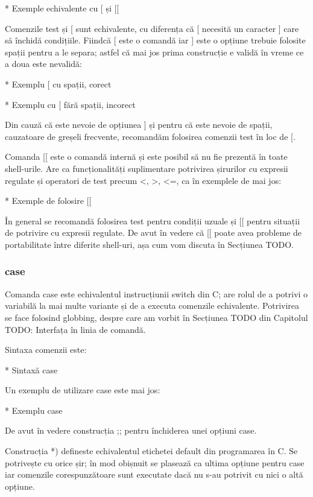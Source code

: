 * Exemple echivalente cu [ și [[

Comenzile test și [ sunt echivalente, cu diferența că [ necesită un caracter ]
care să închidă condițiile. Fiindcă [ este o comandă iar ] este o opțiune
trebuie folosite spații pentru a le separa; astfel că mai jos prima construcție
e validă în vreme ce a doua este nevalidă:

* Exemplu [ cu spații, corect

* Exemplu cu [ fără spații, incorect

Din cauză că este nevoie de opțiunea ] și pentru că este nevoie de spații,
cauzatoare de greșeli frecvente, recomandăm folosirea comenzii test în loc de [.

Comanda [[ este o comandă internă și este posibil să nu fie prezentă în toate
shell-urile. Are ca funcționalități suplimentare potrivirea șirurilor cu
expresii regulate și operatori de test precum <, >, <=, ca în exemplele de mai
jos:

* Exemple de folosire [[

În general se recomandă folosirea test pentru condiții uzuale și [[ pentru
situații de potrivire cu expresii regulate. De avut în vedere că [[ poate avea
probleme de portabilitate între diferite shell-uri, așa cum vom discuta în
Secțiunea TODO.

\subsubsection{case}
\label{sec:auto-func-flux-case}

Comanda case este echivalentul instrucțiunii switch din C; are rolul de a
potrivi o variabilă la mai multe variante și de a executa comenzile echivalente.
Potrivirea se face folosind globbing, despre care am vorbit în Secțiunea TODO
din Capitolul TODO: Interfața în linia de comandă.

Sintaxa comenzii este:

* Sintaxă case

Un exemplu de utilizare case este mai jos:

* Exemplu case

De avut în vedere construcția ;; pentru închiderea unei opțiuni case.

Construcția *) defineste echivalentul etichetei default din programarea în C. Se
potrivește cu orice șir; în mod obișnuit se plasează ca ultima opțiune pentru
case iar comenzile corespunzătoare sunt executate dacă nu s-au potrivit cu nici
o altă opțiune.

